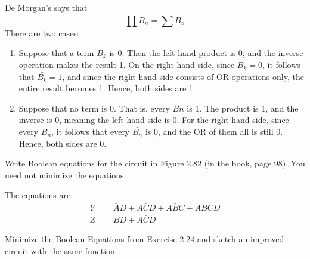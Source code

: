 \documentclass[12pt]{article}
\newenvironment{ex}[2][Exercise]{\begin{trivlist}
		\item[\hskip \labelsep {\bfseries #1}\hskip \labelsep {\bfseries #2.}]}{\end{trivlist}}
\newenvironment{sol}[1][Solution]{\begin{trivlist}
		\item[\hskip \labelsep {\bfseries #1:}]}{\end{trivlist}}
\begin{document}
\begin{sol}
	De Morgan's says that
	\[
	\overline{\prod B_n}=\sum \bar{B_n}
	\]
	There are two cases:
	\begin{enumerate}
		\item 	Suppose that a term $B_k$ is 0. Then the left-hand product
		is 0, and the inverse operation makes the result 1. On the right-hand
		side, since $B_k=0$, it follows that $\bar{B_k}=1$, and since
		the right-hand side consists of OR operations only, the entire result
		becomes 1. Hence, both sides are 1.
		\item Suppose that no term is 0. That is, every $Bn$ is 1. The
		product is 1, and the inverse is 0, meaning the left-hand side is 0.
		For the right-hand side, since every $B_n$, it follows that every
		$\bar{B_n}$ is 0, and the OR of them all is still 0. Hence, both sides
		are 0.
	\end{enumerate}

\end{sol}

\begin{ex}{2.24}
	Write Boolean equations for the circuit in Figure 2.82 (in the book, page 98).
	You need not minimize the equations.
\end{ex}

\begin{sol}
	The equations are:
	\begin{align*}
		Y&=\bar{A}D+A\bar{C}D+A\bar{B}C+ABCD\\
		Z&=BD+A\bar{C}D
	\end{align*}
\end{sol}

\begin{ex}{2.25}
	Minimize the Boolean Equations from Exercise 2.24 and sketch an improved
	circuit with the same function.
\end{ex}
\end{document}
